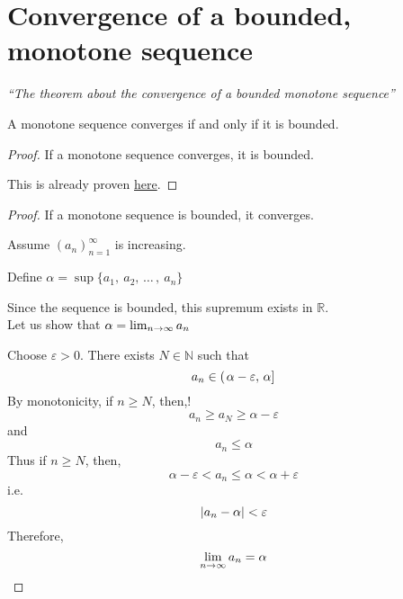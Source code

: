 \documentclass[12pt]{report}
\begin{document}
    \section{Convergence of a bounded, monotone sequence}
    \label{Convergence of a bounded, monotone sequence}
    \textit{``The theorem about the convergence of a bounded monotone sequence''} \vspace{3mm}
    \begin{theorem}
        A monotone sequence converges if and only if it is bounded.
    \end{theorem}
    \begin{proof}
        If a monotone sequence converges, it is bounded.
        
        This is already proven \hyperref[Convergence of a bounded sequence]{here}.
    \end{proof}
    \begin{proof}
        If a monotone sequence is bounded, it converges.
                
        Assume \(\left(a_n\right)^\infty _{n=1}\) is increasing.
        
        Define \(\alpha = \sup \{a_1,~ a_2, \, \dots \, , ~ a_n\}\)

        Since the sequence is bounded, this supremum exists in \(\mathbb{R}\).
        \vspace{5mm}
        \\
        Let us show that \(\alpha = \lim_{n \to \infty} a_n\)
        
        Choose \(\varepsilon > 0\). There exists \(N \in \mathbb{N}\) such that 
        \[a_n \in \left(\left. \alpha - \varepsilon, \, \alpha \right] \right.\]
        By monotonicity, if \(n \geq N\), then,!
        \[a_n \geq a_N \geq \alpha - \varepsilon\]
        and
        \[a_n \leq \alpha\]
        Thus if \(n \geq N\), then,
        \[\alpha - \varepsilon < a_n \leq \alpha < \alpha + \varepsilon\]
        i.e.
        \[\left| a_n - \alpha \right| < \varepsilon\]
        Therefore,
        \[\lim_{n \to \infty} a_n = \alpha\]
    \end{proof} 
\end{document}
